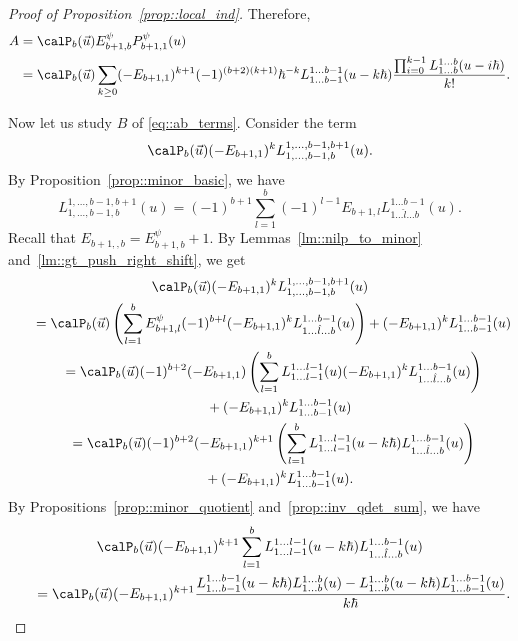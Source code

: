 \begin{proof}[Proof of Proposition~\ref{prop::local_ind}]
		Therefore,
		\begin{align}
				A = {}& \calP_{b}(\vec{u}) E_{b+1,b}^{\psi} P_{b+1,1}^{\psi}(u) \nonumber\\
				={}& \calP_{b}(\vec{u}) \sum\limits_{k\geq 0} (-E_{b+1,1})^{k+1} (-1)^{(b+2)(k+1)} \hbar^{-k} L_{1\dots b-1}^{1\dots b-1}(u-k\hbar) \frac{\prod_{i=0}^{k-1} L_{1\dots b}^{1\dots b}(u-i\hbar)}{k!}.			\label{eq::a_term}
		\end{align}
		
		Now let us study $B$ of \eqref{eq::ab_terms}. Consider the term
		\[
		\calP_{b}(\vec{u})(-E_{b+1,1})^k L_{1,\dots,b-1,b}^{1,\dots,b-1,b+1}(u).
		\]
		By Proposition~\ref{prop::minor_basic}, we have
		\[
		L_{1,\dots,b-1,b}^{1,\dots,b-1,b+1}(u) = (-1)^{b+1} \sum\limits_{l=1}^{b} (-1)^{l-1} E_{b+1,l} L_{1\dots \hat{l} \dots b}^{1\dots b-1}(u).
		\]
		Recall that $E_{b+1,,b} = E_{b+1,b}^{\psi} + 1$. By Lemmas~\ref{lm::nilp_to_minor} and~\ref{lm::gt_push_right_shift}, we get
		\begin{gather*}
			\calP_{b}(\vec{u})(-E_{b+1,1})^k L_{1,\dots,b-1,b}^{1,\dots,b-1,b+1}(u) \\
			\qquad= \calP_{b}(\vec{u}) \left( \sum\limits_{l=1}^{b} E_{b+1,l}^{\psi} (-1)^{b+l} (-E_{b+1,1})^k L_{1\dots \hat{l} \dots b}^{1\dots b-1}(u) \right)+ (-E_{b+1,1})^k L_{1\dots b-1}^{1\dots b-1}(u) \\
			\qquad= \calP_{b}(\vec{u})(-1)^{b+2} (-E_{b+1,1}) \left( \sum\limits_{l=1}^{b} L_{1\dots l-1}^{1\dots l-1}(u) (-E_{b+1,1})^k L_{1\dots \hat{l} \dots b}^{1\dots b-1}(u) \right)\\
\phantom{\qquad= }{} + (-E_{b+1,1})^k L_{1\dots b-1}^{1\dots b-1}(u) \\
		\qquad	= \calP_{b}(\vec{u})(-1)^{b+2} (-E_{b+1,1})^{k+1}\left( \sum\limits_{l=1}^{b} L_{1\dots l-1}^{1\dots l-1}(u-k\hbar) L_{1\dots \hat{l} \dots b}^{1\dots b-1}(u) \right)\\
\phantom{\qquad= }{} + (-E_{b+1,1})^k L_{1\dots b-1}^{1\dots b-1}(u).
		\end{gather*}
		By Propositions~\ref{prop::minor_quotient} and~\ref{prop::inv_qdet_sum}, we have
		\begin{gather*}
			\calP_{b}(\vec{u}) (-E_{b+1,1})^{k+1} \sum\limits_{l=1}^{b} L_{1\dots l-1}^{1\dots l-1}(u-k\hbar) L_{1\dots \hat{l} \dots b}^{1\dots b-1}(u) \\
			\qquad=\calP_{b}(\vec{u}) (-E_{b+1,1})^{k+1} \frac{L_{1\dots b-1}^{1\dots b-1}(u-k\hbar) L_{1\dots b}^{1\dots b}(u) - L_{1\dots b}^{1\dots b}(u-k\hbar) L_{1\dots b-1}^{1\dots b-1}(u)}{k\hbar}.

\end{gather*}
\end{proof}
